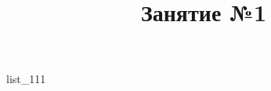 \documentclass[12pt, a4paper]{article}
\begin{document}
	\title{Занятие №1}
	{list_111}
\end{document}
